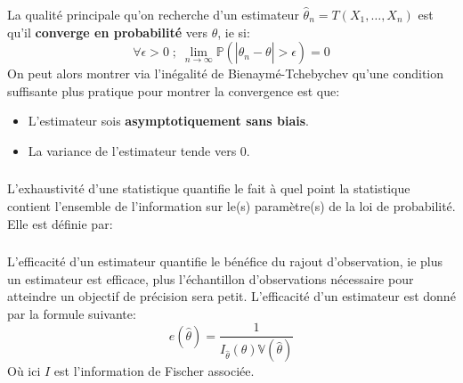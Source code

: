 \subsection*{}
La qualité principale qu'on recherche d'un estimateur \( \hat{\theta}_n =  T(X_1, \ldots, X_n) \) est qu'il \textbf{converge en probabilité} vers \( \theta \), ie si:
\[ 
   \forall \epsilon > 0 \; ; \; \lim_{n \longrightarrow \infty} \mathbb{P}(|\hat{\theta}_n - \theta| > \epsilon) = 0 
\]
On peut alors montrer via l'inégalité de Bienaymé-Tchebychev qu'une condition suffisante plus pratique pour montrer la convergence est que:
\begin{itemize}
   \item L'estimateur sois \textbf{asymptotiquement sans biais}.
   \item La variance de l'estimateur tende vers 0.
\end{itemize}  
\subsection*{}
L'exhaustivité d'une statistique quantifie le fait à quel point la statistique contient l'ensemble de l'information sur le(s) paramètre(s) de la loi de probabilité. Elle est définie par:
\subsection*{}
L'efficacité d'un estimateur quantifie le bénéfice du rajout d'observation, ie plus un estimateur est efficace, plus l'échantillon d'observations nécessaire pour atteindre un objectif de précision sera petit. L'efficacité d'un estimateur est donné par la formule suivante:
\[ 
   e(\hat{ \theta}) = \frac{1}{I_{\hat{\theta}}(\theta) \mathbb{V}(\hat{\theta})} 
\]
Où ici \( I \) est l'information de Fischer associée.
\chapter*{} %
